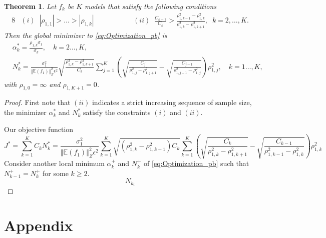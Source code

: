 \documentclass[final,3p,times,11pt]{elsarticle}
\newtheorem{theorem}{Theorem}%
\begin{document}
\begin{theorem}
\label{thm:Sample_size_est}
Let $f_k$ be $K$ models that satisfy the following conditions
%
\begin{alignat*}{8}
    &(i)\;\; |\rho_{1,1}|>\ldots>|\rho_{1,k}|& \qquad \qquad
    &(ii)\;\; \frac{C_{k-1}}{C_k}>\frac{\rho_{1,k-1}^2-\rho_{1,k}^2}{\rho_{1,k}^2-\rho_{1,k+1}^2},\;\;k=2,\ldots,K.
\end{alignat*}
%
Then the global minimizer to \eqref{eq:Optimization_pb} is 
\begin{align*}
    &\alpha_k^*=\frac{\rho_{1,k}\sigma_1}{\sigma_k}, \quad k=2\ldots, K,\\
    &N_k^*=\frac{\sigma_1^2}{\left\Vert\mathbb{E}(f_1) \right\Vert_{Z}^2\epsilon^2}\sqrt{\frac{\rho_{1,k}^2 - \rho_{1,k+1}^2}{C_k}}\sum_{j=1}^K\left(\sqrt{\frac{C_j}{\rho_{1,j}^2 - \rho_{1,j+1}^2}} - \sqrt{\frac{C_{j-1}}{\rho_{1,{j-1}}^2 - \rho_{1,j}^2}}\right)\rho_{1,j}^2, \quad k=1\ldots, K,
\end{align*}
with $\rho_{1,0}=\infty$ and $\rho_{1,K+1}=0$.

\end{theorem}
\begin{proof}
First note that $(ii)$ indicates a strict increasing sequence of sample size, the minimizer $\alpha_k^*$ and $N_k^*$ satisfy the constraints $(i)$ and $(ii)$.

Our objective function
\[
J^* = \sum_{k=1}^K C_kN_k^* = \frac{\sigma_1^2}{\left\Vert\mathbb{E}(f_1) \right\Vert_{Z}^2\epsilon^2}\sum_{k=1}^K\sqrt{\left(\rho_{1,k}^2 - \rho_{1,k+1}^2\right)C_k}\sum_{k=1}^K\left(\sqrt{\frac{C_k}{\rho_{1,k}^2 - \rho_{1,k+1}^2}} - \sqrt{\frac{C_{k-1}}{\rho_{1,{k-1}}^2 - \rho_{1,k}^2}}\right)\rho_{1,k}^2
\]
Consider another local minimum $\alpha_k^+$ and $N_k^+$ of \eqref{eq:Optimization_pb} such that $N_{k-1}^+ = N_{k}^+$ for some $k\ge 2$.
\[
N_{k_i}
\]
\end{proof}





\section{Appendix}\label{sec:Appendix}





\end{document}
